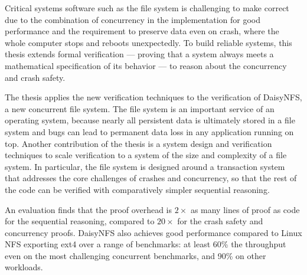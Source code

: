 Critical systems software such as the file system is challenging to make correct
due to the combination of concurrency in the implementation for good performance
and the requirement to preserve data even on crash, where the whole computer
stops and reboots unexpectedly. To build reliable systems, this thesis extends
formal verification --- proving that a system always meets a mathematical
specification of its behavior --- to reason about the concurrency and crash safety.

The thesis applies the new verification techniques to the verification of DaisyNFS, a new
concurrent file system. The file system is an important service of an operating
system, because nearly all persistent data is ultimately stored in a file system
and bugs can lead to permanent data loss in any application running on top.
Another contribution of the thesis is a system design and verification techniques
to scale verification to a system of the size and complexity of a file system.
In particular, the file system is designed around a transaction system that
addresses the core challenges of crashes and concurrency, so that the rest of
the code can be verified with comparatively simpler sequential reasoning.

An evaluation finds that the proof overhead is $2\times$ as many lines of proof
as code for the sequential reasoning, compared to $20\times$ for the crash
safety and concurrency proofs. DaisyNFS also achieves good performance compared
to Linux NFS exporting ext4 over a range of benchmarks: at least 60\% the
throughput even on the most challenging concurrent benchmarks, and 90\% on other
workloads.
